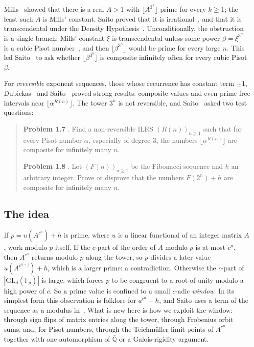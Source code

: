 \documentclass[11pt]{amsart}
\theoremstyle{definition}
\newcommand{\F}{\mathbb{F}}
\newcommand{\Qbar}{\overline{\mathbb{Q}}}
\newcommand{\GL}{\mathrm{GL}}
\newcommand{\floor}[1]{\lfloor #1 \rfloor}
\begin{document}
Mills~\cite{Mil47} showed that there is a real $A>1$ with $\floor{A^{3^k}}$ prime for every $k\ge1$; the least such $A$ is Mills' constant.  Saito proved that it is irrational~\cite{Sai24}, and that it is transcendental under the Density Hypothesis~\cite{Sai25c}.  Unconditionally, the obstruction is a single branch: Mills' constant $\xi$ is transcendental unless some power $\beta=\xi^{3^m}$ is a cubic Pisot number~\cite[Theorem~1.5]{Sai24}, and then $\floor{\beta^{3^n}}$ would be prime for every large $n$.  This led Saito~\cite[Problem~1.1]{Sai25a} to ask whether $\floor{\beta^{3^n}}$ is composite infinitely often for every cubic Pisot $\beta$.

For \emph{reversible} exponent sequences, those whose recurrence has constant term $\pm1$, Dubickas~\cite{Dub02,Dub18} and Saito~\cite{Sai25a} proved strong results: composite values and even prime-free intervals near $\floor{\alpha^{R(n)}}$.  The tower $3^n$ is not reversible, and Saito~\cite{Sai25a} asked two test questions:

\begin{quote}
\textbf{Problem 1.7} \cite{Sai25a}.  Find a non-reversible ILRS $(R(n))_{n\ge1}$ such that for every Pisot number $\alpha$, especially of degree $3$, the numbers $\floor{\alpha^{R(n)}}$ are composite for infinitely many $n$.

\textbf{Problem 1.8} \cite{Sai25a}.  Let $(F(n))_{n\ge1}$ be the Fibonacci sequence and $h$ an arbitrary integer.  Prove or disprove that the numbers $F(2^n)+h$ are composite for infinitely many $n$.
\end{quote}

\subsection*{The idea}
If $p=u(A^{c^n})+h$ is prime, where $u$ is a linear functional of an integer matrix $A$, work modulo $p$ itself.  If the $c$-part of the order of $A$ modulo $p$ is at most $c^n$, then $A^{c^n}$ returns modulo $p$ along the tower, so $p$ divides a later value $u(A^{c^{n+j}})+h$, which is a larger prime: a contradiction.  Otherwise the $c$-part of $|\GL_d(\F_p)|$ is large, which forces $p$ to be congruent to a root of unity modulo a high power of $c$.  So a prime value is confined to a small $c$-adic \emph{window}.  In its simplest form this observation is folklore for $a^{c^n}+h$, and Saito uses a term of the sequence as a modulus in~\cite[\S8]{Sai25c}.  What is new here is how we exploit the window: through sign flips of matrix entries along the tower, through Frobenius orbit sums, and, for Pisot numbers, through the Teichm\"uller limit points of $A^{c^n}$ together with one automorphism of $\Qbar$ or a Galois-rigidity argument.
\end{document}
